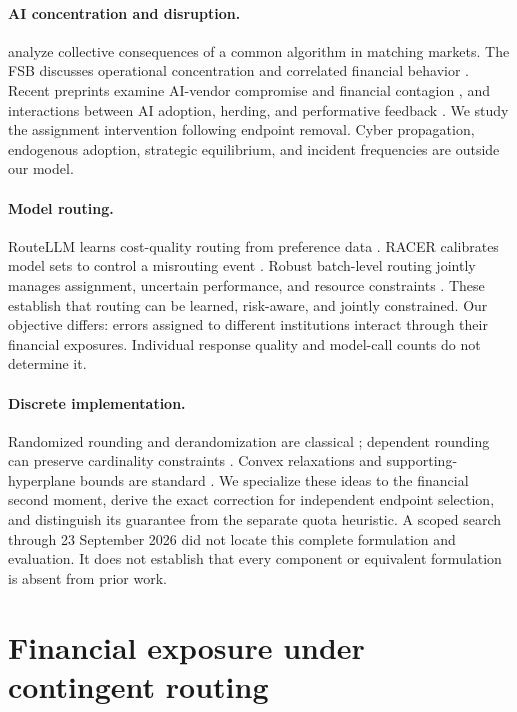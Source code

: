 \documentclass[11pt]{article}
\begin{document}
\paragraph{AI concentration and disruption.}
\citet{kleinberg2021} analyze collective consequences of a common algorithm in matching markets. The FSB discusses operational concentration and correlated financial behavior \citep{fsb2024}. Recent preprints examine AI-vendor compromise and financial contagion \citep{leytes2026}, and interactions between AI adoption, herding, and performative feedback \citep{meng2026}. We study the assignment intervention following endpoint removal. Cyber propagation, endogenous adoption, strategic equilibrium, and incident frequencies are outside our model.

\paragraph{Model routing.}
RouteLLM learns cost-quality routing from preference data \citep{ong2024}. RACER calibrates model sets to control a misrouting event \citep{hao2026}. Robust batch-level routing jointly manages assignment, uncertain performance, and resource constraints \citep{markovic2026}. These establish that routing can be learned, risk-aware, and jointly constrained. Our objective differs: errors assigned to different institutions interact through their financial exposures. Individual response quality and model-call counts do not determine it.

\paragraph{Discrete implementation.}
Randomized rounding and derandomization are classical \citep{raghavan1987}; dependent rounding can preserve cardinality constraints \citep{gandhi2006}. Convex relaxations and supporting-hyperplane bounds are standard \citep{boyd2004}. We specialize these ideas to the financial second moment, derive the exact correction for independent endpoint selection, and distinguish its guarantee from the separate quota heuristic. A scoped search through 23 September 2026 did not locate this complete formulation and evaluation. It does not establish that every component or equivalent formulation is absent from prior work.

\section{Financial exposure under contingent routing}
\end{document}
